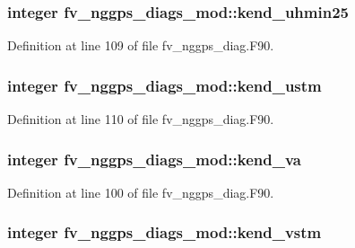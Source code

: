 \subsubsection[{kend\-\_\-uhmin25}]{\setlength{\rightskip}{0pt plus 5cm}integer fv\-\_\-nggps\-\_\-diags\-\_\-mod\-::kend\-\_\-uhmin25\hspace{0.3cm}{\ttfamily [private]}}\label{classfv__nggps__diags__mod_ab6c67f2d511df4ff9aaebbc9cd50ee0b}


Definition at line 109 of file fv\-\_\-nggps\-\_\-diag.\-F90.

\subsubsection[{kend\-\_\-ustm}]{\setlength{\rightskip}{0pt plus 5cm}integer fv\-\_\-nggps\-\_\-diags\-\_\-mod\-::kend\-\_\-ustm\hspace{0.3cm}{\ttfamily [private]}}\label{classfv__nggps__diags__mod_aa4d8f69c24c8046c34dc89485c2c4569}


Definition at line 110 of file fv\-\_\-nggps\-\_\-diag.\-F90.

\subsubsection[{kend\-\_\-va}]{\setlength{\rightskip}{0pt plus 5cm}integer fv\-\_\-nggps\-\_\-diags\-\_\-mod\-::kend\-\_\-va\hspace{0.3cm}{\ttfamily [private]}}\label{classfv__nggps__diags__mod_a1080bff68c07915d95f82fd40b4e76fc}


Definition at line 100 of file fv\-\_\-nggps\-\_\-diag.\-F90.

\subsubsection[{kend\-\_\-vstm}]{\setlength{\rightskip}{0pt plus 5cm}integer fv\-\_\-nggps\-\_\-diags\-\_\-mod\-::kend\-\_\-vstm\hspace{0.3cm}{\ttfamily [private]}}\label{classfv__nggps__diags__mod_a3285e3b7986deb7f90ba3a8cdb5e5c7f}


